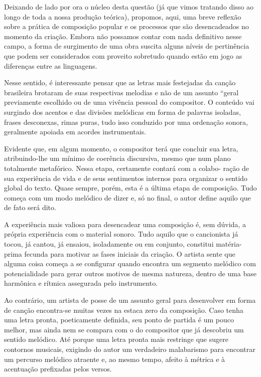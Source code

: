 Deixando de lado por ora o núcleo desta questão (já que vimos tratando
disso ao longo de toda a nossa produção teórica), propomos, aqui, uma
breve reflexão sobre a prática de composição popular e os processos que
são desencadeados no momento da criação. Embora não possamos contar com
nada definitivo nesse campo, a forma de surgimento de uma obra suscita
alguns níveis de pertinência que podem ser considerados com proveito
sobretudo quando estão em jogo as diferenças entre as linguagens.~

Nesse sentido, é interessante pensar que as letras mais festejadas da
canção brasileira brotaram de suas respectivas melodias e não de um
assunto ``geral previamente escolhido ou de uma vivência pessoal do
compositor. O conteúdo vai surgindo dos acentos e das divisões melódicas
em forma de palavras isoladas, frases desconexas, rimas puras, tudo isso
conduzido por uma ordenação sonora, geralmente apoiada em acordes
instrumentais.~

Evidente que, em algum momento, o compositor terá que concluir sua
letra, atribuindo-lhe um mínimo de coerência discursiva, mesmo que num
plano totalmente metafórico. Nessa etapa, certamente contará com a
colabo- ração de sua experiência de vida e de seus sentimentos internos
para organizar o sentido global do texto. Quase sempre, porém, esta é a
última etapa de composição. Tudo começa com um modo melódico de dizer e,
só no final, o autor define aquilo que de fato será dito.

A experiência mais valiosa para desencadear uma composição é, sem
dúvida, a própria experiência com o material sonoro. Tudo aquilo que o
cancionista já tocou, já cantou, já ensaiou, isoladamente ou em
conjunto, constitui matéria-prima fecunda para motivar as fases iniciais
da criação. O artista sente que alguma coisa começa a se configurar
quando encontra um segmento melódico com potencialidade para gerar
outros motivos de mesma natureza, dentro de uma base harmônica e rítmica
assegurada pelo instrumento.

Ao contrário, um artista de posse de um assunto geral para desenvolver
em forma de canção encontra-se muitas vezes na estaca zero da
composição. Caso tenha uma letra pronta, poeticamente definida, seu
ponto de partida é um pouco melhor, mas ainda nem se compara com o do
compositor que já descobriu um sentido melódico. Até porque uma letra
pronta mais restringe que sugere contornos musicais, exigindo do autor
um verdadeiro malabarismo para encontrar um percurso melódico atraente
e, ao mesmo tempo, afeito à métrica e à acentuação prefixadas pelos
versos.

